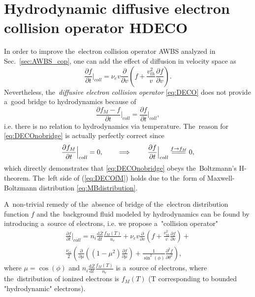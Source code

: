 \documentclass[preprint,12pt]{elsarticle}
\newcommand{\pdv}[2]{\frac{\partial{#1}}{\partial{#2}}}
\newcommand{\dI}{\text{d}}
\newcommand{\odv}[2]{\frac{\dI #1}{\dI #2}}
\newcommand{\ddv}[2]{\odv{#1}{#2}}
\newcommand{\collpdv}[2]{\pdv{#1}{#2}\Big|_{coll}}
\newcommand{\Zbar}{\bar{Z}}
\newcommand{\nue}{\nu_{e}}
\newcommand{\nuei}{\nu_{ei}}
\newcommand{\vmag}{v}
\newcommand{\vth}{v_{th}}
\newcommand{\fM}{f_M}
\newcommand{\secref}[1]{Sec.~\ref{#1}}
\begin{document}
\clearpage

\section{Hydrodynamic diffusive electron collision operator HDECO}
\label{sec:diffusivecollisionoperator}
In order to improve the~electron collision operator AWBS analyzed 
in \secref{sec:AWBS_cop}, one can add the effect of diffusion in velocity space
as 
\begin{equation}
  \collpdv{f}{t} = \nue\vmag\pdv{}{\vmag}\left( f + 
  \frac{\vth^2}{\vmag} \pdv{f}{\vmag}\right) .
  \label{eq:DECO}
\end{equation}
Nevertheless, the~\textit{diffusive electron collision operator} \eqref{eq:DECO}
does not provide a~good bridge to hydrodynamics because of
\begin{equation}
  \collpdv{\fM - f}{t} = \collpdv{f}{t} ,
  \label{eq:DECOnobridge}
\end{equation}
i.e. there is no relation to hydrodynamics via temperature.
The~reason for \eqref{eq:DECOnobridge} is actually perfectly correct since
\begin{equation}
  \collpdv{\fM}{t} = 0 ,
  \qquad \implies\qquad \collpdv{f}{t} 
 \stackrel{ f\rightarrow\fM }{{\scalebox{3}[1]{=}}} 0,
  \label{eq:DECOfM}
\end{equation}
which directly demonstrates that \eqref{eq:DECOnobridge} obeys the~Boltzmann's
H-theorem. The~left side of (\ref{eq:DECOfM}) holds due to the~form of
Maxwell-Boltzmann distribution \eqref{eq:MBdistribution}.

A~non-trivial remedy of the~absence of bridge of the~electron distribution
function $f$ and the~background fluid modeled by hydrodynamics can be
found by introducing a~source of electrons, i.e. we propose 
a~"collision operator"
\begin{multline}
  \collpdv{f}{t} = n_i \ddv{\Zbar}{t}\frac{\fM(T)}{n_e} +
  \nue \vmag \pdv{}{\vmag}\left( f + 
  \frac{\vth^2}{\vmag} \pdv{f}{\vmag}\right) + \\
  \frac{\nuei}{2} 
  \left(\pdv{}{\mu}\left((1 - \mu^2)\pdv{f}{\mu}\right)
  + \frac{1}{\sin^2(\phi)}\frac{\partial^2f}{\partial\theta^2} \right) ,
  \label{eq:HDECO}
\end{multline}
where $\mu = \cos(\phi)$ and $n_i \ddv{\Zbar}{t}\frac{\fM(T)}{n_e}$ is a~source
of electrons, where the~distribution of ionized electrons is $\fM(T)$ 
(T corresponding to bounded "hydrodynamic" electrons).
\end{document}
